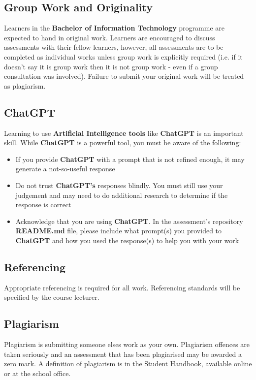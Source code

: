 \documentclass{article}
\begin{document}
\subsection*{Group Work and Originality}
Learners in the \textbf{Bachelor of Information Technology} programme are expected to hand in original work. Learners are encouraged to discuss assessments with their fellow learners, however, all assessments are to be completed as individual works unless group work is explicitly required (i.e. if it doesn't say it is group work then it is not group work - even if a group consultation was involved). Failure to submit your original work will be treated as plagiarism.

\subsection*{ChatGPT}
Learning to use \textbf{Artificial Intelligence tools} like \textbf{ChatGPT} is an important skill. While \textbf{ChatGPT} is a powerful tool, you must be aware of the following:

\begin{itemize}
    \item If you provide \textbf{ChatGPT} with a prompt that is not refined enough, it may generate a not-so-useful response
    \item Do not trust \textbf{ChatGPT's} responses blindly. You must still use your judgement and may need to do additional research to determine if the response is correct
    \item Acknowledge that you are using \textbf{ChatGPT}. In the assessment's repository \textbf{README.md} file, please include what prompt(s) you provided to \textbf{ChatGPT} and how you used the response(s) to help you with your work
\end{itemize}

\subsection*{Referencing}
Appropriate referencing is required for all work. Referencing standards will be specified by the course lecturer.

\subsection*{Plagiarism}
Plagiarism is submitting someone elses work as your own. Plagiarism offences are taken seriously and an assessment that has been plagiarised may be awarded a zero mark. A definition of plagiarism is in the Student Handbook, available online or at the school office.
\end{document}
